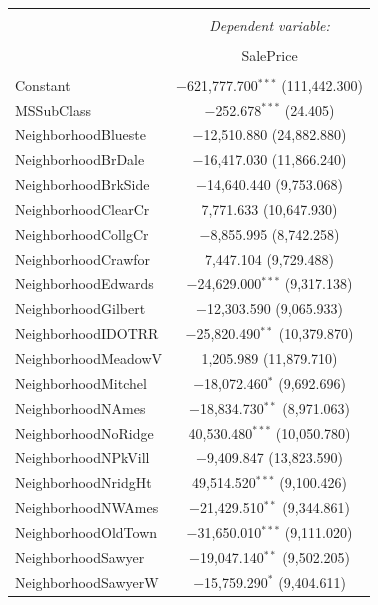 \documentclass[]{article}
\begin{document}
\begin{table}[!htbp] \centering 
  \caption{} 
  \label{} 
\footnotesize 
\begin{tabular}{@{\extracolsep{5pt}}lc} 
\\[-1.8ex]\hline 
\hline \\[-1.8ex] 
 & \multicolumn{1}{c}{\textit{Dependent variable:}} \\ 
\cline{2-2} 
\\[-1.8ex] & SalePrice \\ 
\hline \\[-1.8ex] 
 Constant & $-$621,777.700$^{***}$ (111,442.300) \\ 
  MSSubClass & $-$252.678$^{***}$ (24.405) \\ 
  NeighborhoodBlueste & $-$12,510.880 (24,882.880) \\ 
  NeighborhoodBrDale & $-$16,417.030 (11,866.240) \\ 
  NeighborhoodBrkSide & $-$14,640.440 (9,753.068) \\ 
  NeighborhoodClearCr & 7,771.633 (10,647.930) \\ 
  NeighborhoodCollgCr & $-$8,855.995 (8,742.258) \\ 
  NeighborhoodCrawfor & 7,447.104 (9,729.488) \\ 
  NeighborhoodEdwards & $-$24,629.000$^{***}$ (9,317.138) \\ 
  NeighborhoodGilbert & $-$12,303.590 (9,065.933) \\ 
  NeighborhoodIDOTRR & $-$25,820.490$^{**}$ (10,379.870) \\ 
  NeighborhoodMeadowV & 1,205.989 (11,879.710) \\ 
  NeighborhoodMitchel & $-$18,072.460$^{*}$ (9,692.696) \\ 
  NeighborhoodNAmes & $-$18,834.730$^{**}$ (8,971.063) \\ 
  NeighborhoodNoRidge & 40,530.480$^{***}$ (10,050.780) \\ 
  NeighborhoodNPkVill & $-$9,409.847 (13,823.590) \\ 
  NeighborhoodNridgHt & 49,514.520$^{***}$ (9,100.426) \\ 
  NeighborhoodNWAmes & $-$21,429.510$^{**}$ (9,344.861) \\ 
  NeighborhoodOldTown & $-$31,650.010$^{***}$ (9,111.020) \\ 
  NeighborhoodSawyer & $-$19,047.140$^{**}$ (9,502.205) \\ 
  NeighborhoodSawyerW & $-$15,759.290$^{*}$ (9,404.611) \\ 

\end{tabular}
\end{table}
\end{document}
